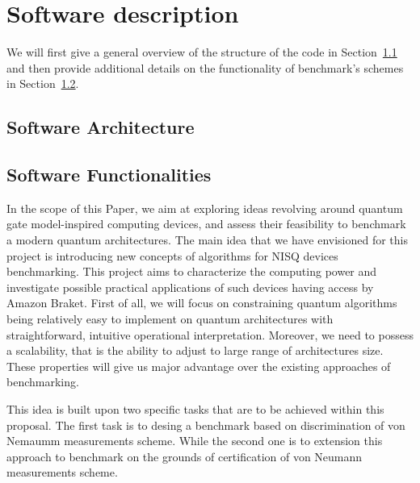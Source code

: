 \documentclass[preprint,12pt, a4paper]{elsarticle}
\newcommand{\1}{{\rm 1\hspace{-0.9mm}l}}
\begin{document}
\section{Software description}
\label{}

We will first give a general overview of the structure of the code in Section~\ref{sec:sortware-architecture} and then provide additional details on the functionality of benchmark's schemes  in Section~\ref{sec:sortware-functionalities}.

\subsection{Software Architecture}\label{sec:sortware-architecture}
\label{}


\subsection{Software Functionalities}\label{sec:sortware-functionalities}

In the scope of this Paper, we aim at  exploring ideas revolving around quantum gate model-inspired computing devices, and assess their feasibility to benchmark a modern quantum architectures. The main idea that we have envisioned for this project is  introducing new concepts of algorithms for NISQ devices benchmarking. This project aims to characterize the computing power and investigate possible practical applications of such devices having access by Amazon Braket.  First of all, we will focus on constraining quantum algorithms being relatively easy to implement on quantum architectures with straightforward, intuitive operational interpretation. Moreover, we need to possess a scalability, that is the ability to adjust to large range of architectures size.  
These properties will give us major advantage over the existing approaches  of benchmarking. 


This idea is built upon two specific tasks that are to be achieved within this proposal. 
The first task is to   desing a benchmark based on discrimination of von Nemaumm measurements scheme. While the second one is to extension  this approach to benchmark on the grounds of certification of von Neumann measurements scheme.
\end{document}
